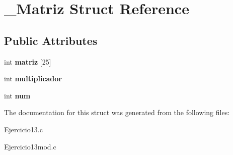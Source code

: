 \hypertarget{struct__Matriz}{}\section{\+\_\+\+Matriz Struct Reference}
\label{struct__Matriz}
\subsection*{Public Attributes}
\begin{DoxyCompactItemize}
\item 
\mbox{\label{struct__Matriz_a6337b1f593d346d6d95f71f2bc7ee956}} 
int {\bfseries matriz} \mbox{[}25\mbox{]}
\item 
\mbox{\label{struct__Matriz_a28b54566957d146f3e95c293afdab221}} 
int {\bfseries multiplicador}
\item 
\mbox{\label{struct__Matriz_a18173573b3b481717d907aeb3b6876a9}} 
int {\bfseries num}
\end{DoxyCompactItemize}


The documentation for this struct was generated from the following files\+:\begin{DoxyCompactItemize}
\item 
Ejercicio13.\+c\item 
Ejercicio13mod.\+c\end{DoxyCompactItemize}
